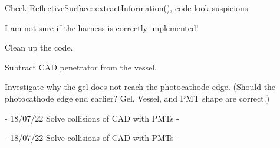 
\begin{DoxyRefList}
\item[File \mbox{\hyperlink{_o_m_sim_data_file_types_8cc}{OMSim\+Data\+File\+Types.cc}} ]\label{todo__todo000001}%
%
Check \mbox{\hyperlink{class_reflective_surface_a5dff8f89e20cf4e629024fe3a1b1d78f}{Reflective\+Surface\+::extract\+Information()}}, code look suspicious.  
\item[File \mbox{\hyperlink{_o_m_sim_d_e_g_g_8cc}{OMSim\+DEGG.cc}} ]\label{todo__todo000002}%
%

\begin{DoxyItemize}
\item I am not sure if the harness is correctly implemented!
\item Clean up the code.
\item Subtract CAD penetrator from the vessel.
\item Investigate why the gel does not reach the photocathode edge. (Should the photocathode edge end earlier? Gel, Vessel, and PMT shape are correct.) 
\end{DoxyItemize}
\item[File \mbox{\hyperlink{_o_m_sim_l_o_m16_8cc}{OMSim\+LOM16.cc}} ]\label{todo__todo000003}%
%
-\/ 18/07/22 Solve collisions of CAD with PMTs -\/ 
\item[File \mbox{\hyperlink{_o_m_sim_l_o_m18_8cc}{OMSim\+LOM18.cc}} ]\label{todo__todo000004}%
%
-\/ 18/07/22 Solve collisions of CAD with PMTs -\/ 
\item[File \mbox{\hyperlink{_o_m_sim_p_m_t_construction_8cc}{OMSim\+PMTConstruction.cc}} ]\label{todo__todo000005}%
%

\end{DoxyRefList}